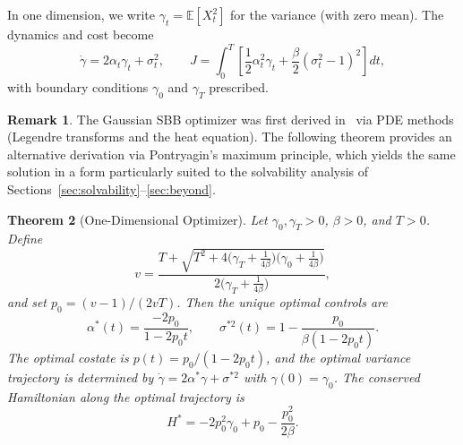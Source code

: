 \documentclass[12pt]{article}
\newtheorem{theorem}{Theorem}[section]
\theoremstyle{definition}
\newtheorem{remark}[theorem]{Remark}
\newcommand{\E}{\mathbb{E}}
\begin{document}
In one dimension, we write $\gamma_t = \E[X_t^2]$ for the variance (with
zero mean).
The dynamics and cost become
\begin{equation}\label{eq:1d-dynamics}
\dot\gamma = 2\alpha_t \gamma_t + \sigma_t^2, \qquad
J = \int_0^T \left[\frac{1}{2}\alpha_t^2 \gamma_t +
  \frac{\beta}{2}(\sigma_t^2 - 1)^2\right] dt,
\end{equation}
with boundary conditions $\gamma_0$ and $\gamma_T$ prescribed.

\begin{remark}
The Gaussian SBB optimizer was first derived in~\cite{PDE26}
via PDE methods (Legendre transforms and the heat equation).
The following theorem provides an alternative derivation via
Pontryagin's maximum principle, which yields the same solution
in a form particularly suited to the solvability analysis of
Sections~\ref{sec:solvability}--\ref{sec:beyond}.
\end{remark}

\begin{theorem}[One-Dimensional Optimizer]\label{thm:1d}
Let $\gamma_0, \gamma_T > 0$, $\beta > 0$, and $T > 0$.
Define
\begin{equation}\label{eq:quadratic}
v = \frac{T + \sqrt{T^2 + 4\bigl(\gamma_T + \tfrac{1}{4\beta}\bigr)
  \bigl(\gamma_0 + \tfrac{1}{4\beta}\bigr)}}{2\bigl(\gamma_T +
  \tfrac{1}{4\beta}\bigr)},
\end{equation}
and set $p_0 = (v-1)/(2vT)$.
Then the unique optimal controls are
\begin{equation}\label{eq:opt-controls}
\alpha^*(t) = \frac{-2p_0}{1 - 2p_0 t}, \qquad
\sigma^{*2}(t) = 1 - \frac{p_0}{\beta(1 - 2p_0 t)}.
\end{equation}
The optimal costate is $p(t) = p_0/(1 - 2p_0 t)$, and the
optimal variance trajectory is determined by $\dot\gamma =
2\alpha^* \gamma + \sigma^{*2}$ with $\gamma(0) = \gamma_0$.
The conserved Hamiltonian along the optimal trajectory is
\begin{equation}\label{eq:hamiltonian-value}
H^* = -2p_0^2 \gamma_0 + p_0 - \frac{p_0^2}{2\beta}.
\end{equation}
\end{theorem}
\end{document}
